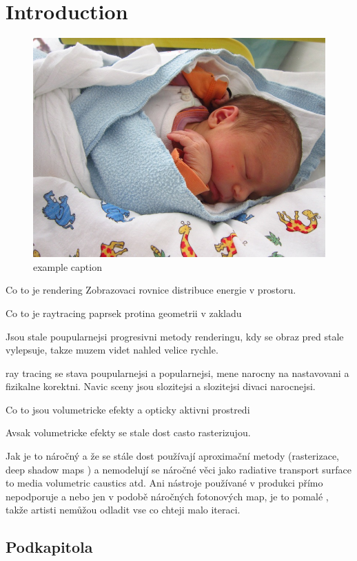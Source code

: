 \chapter{Introduction}


\begin{figure}
   \centering
   \includegraphics{example.jpg} %
   \caption{example caption}
   \label{fig:example}
\end{figure}

   
Co to je rendering
Zobrazovaci rovnice distribuce energie v prostoru. 

Co to je raytracing
paprsek protina geometrii v zakladu 

Jsou stale poupularnejsi progresivni metody renderingu, kdy se obraz pred stale vylepsuje, takze muzem videt nahled velice rychle.


ray tracing se stava poupularnejsi a popularnejsi, mene narocny na nastavovani a fizikalne korektni. Navic sceny jsou slozitejsi a slozitejsi divaci narocnejsi. 

Co to jsou volumetricke efekty a opticky aktivni prostredi

Avsak volumetricke efekty se stale dost casto rasterizujou.

Jak je to náročný a že se stále dost používají aproximační metody (rasterizace, deep shadow maps ) a nemodelují se náročné věci jako radiative transport surface to media volumetric caustics atd. Ani nástroje používané v produkci přímo nepodporuje a nebo jen v podobě náročných fotonových map, je to pomalé , takže artisti nemůžou odladit vse co chteji malo iteraci.



\section{Podkapitola}
